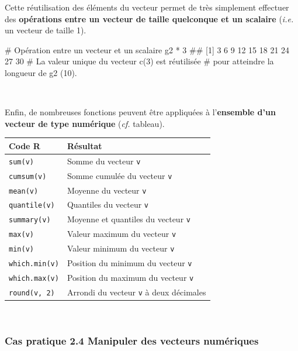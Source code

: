 \documentclass[12pt,twosided, notitlepage]{book}
\newenvironment{Shaded}{}{}
\newcommand{\DecValTok}[1]{#1}
\newcommand{\StringTok}[1]{\textcolor[rgb]{0.00,0.50,0.50}{#1}}
\newcommand{\CommentTok}[1]{\textcolor[rgb]{0.00,0.50,0.00}{#1}}
\newcommand{\OperatorTok}[1]{#1}
\newcommand{\NormalTok}[1]{#1}
\renewenvironment{Shaded}{\begin{snugshade}}{\end{snugshade}}
\begin{document}
Cette réutilisation des éléments du vecteur permet de très simplement
effectuer des \textbf{opérations entre un vecteur de taille quelconque
et un scalaire} (\emph{i.e.} un vecteur de taille 1).

\begin{Shaded}
\begin{Highlighting}[]
\CommentTok{# Opération entre un vecteur et un scalaire}
\NormalTok{g2 }\OperatorTok{*}\StringTok{ }\DecValTok{3}
\NormalTok{  ##  [1]  3  6  9 12 15 18 21 24 27 30}
\CommentTok{# La valeur unique du vecteur c(3) est réutilisée}
\CommentTok{# pour atteindre la longueur de g2 (10). }
\end{Highlighting}
\end{Shaded}

~

Enfin, de nombreuses fonctions peuvent être appliquées à
l'\textbf{ensemble d'un vecteur de type numérique} (\emph{cf.} tableau).

\begin{longtable}[]{@{}ll@{}}
\toprule
\textbf{Code R} & \textbf{Résultat}\tabularnewline
\midrule
\endhead
\texttt{sum(v)}\index{\texttt{sum}|textbf} & Somme du vecteur
\texttt{v}\tabularnewline
\texttt{cumsum(v)}\index{\texttt{cumsum}|textbf} & Somme cumulée du
vecteur \texttt{v}\tabularnewline
\texttt{mean(v)}\index{\texttt{mean}|textbf} & Moyenne du vecteur
\texttt{v}\tabularnewline
\texttt{quantile(v)}\index{\texttt{quantile}|textbf} & Quantiles du
vecteur \texttt{v}\tabularnewline
\texttt{summary(v)}\index{\texttt{summary}|textbf} & Moyenne et
quantiles du vecteur \texttt{v}\tabularnewline
\texttt{max(v)}\index{\texttt{max}|textbf} & Valeur maximum du vecteur
\texttt{v}\tabularnewline
\texttt{min(v)}\index{\texttt{min}|textbf} & Valeur minimum du vecteur
\texttt{v}\tabularnewline
\texttt{which.min(v)}\index{\texttt{which.min}|textbf} & Position du
minimum du vecteur \texttt{v}\tabularnewline
\texttt{which.max(v)}\index{\texttt{which.max}|textbf} & Position du
maximum du vecteur \texttt{v}\tabularnewline
\texttt{round(v,\ 2)}\index{\texttt{round}|textbf} & Arrondi du vecteur
\texttt{v} à deux décimales\tabularnewline
\bottomrule
\end{longtable}

~

\subsubsection{\texorpdfstring{\textbf{Cas pratique 2.4} Manipuler des
vecteurs
numériques}{Cas pratique 2.4 Manipuler des vecteurs numériques}}\label{cas-pratique-2.4-manipuler-des-vecteurs-numeriques}
\end{document}
